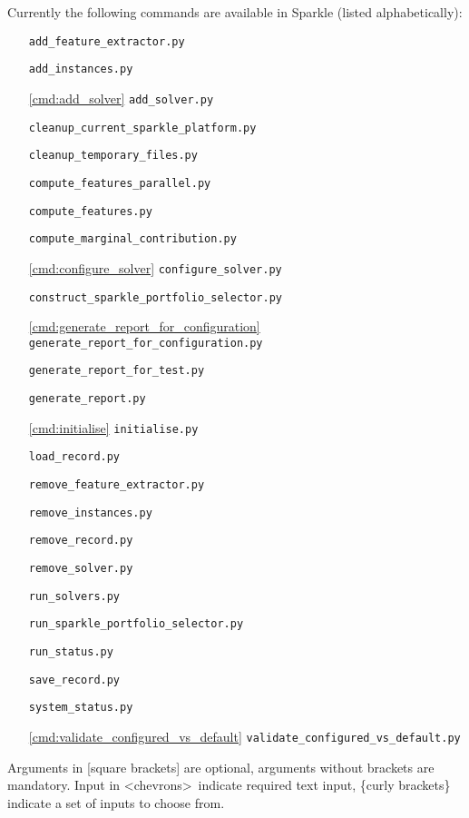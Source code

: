 \documentclass{article}
\begin{document}
Currently the following commands are available in Sparkle (listed alphabetically):

\begin{itemize}[noitemsep]
  \item[] \texttt{add\_feature\_extractor.py}
  \item[] \texttt{add\_instances.py}
  \item[\ref{cmd:add_solver}] \texttt{add\_solver.py}
  \item[] \texttt{cleanup\_current\_sparkle\_platform.py}
  \item[] \texttt{cleanup\_temporary\_files.py}
  \item[] \texttt{compute\_features\_parallel.py}
  \item[] \texttt{compute\_features.py}
  \item[] \texttt{compute\_marginal\_contribution.py}
  \item[\ref{cmd:configure_solver}] \texttt{configure\_solver.py}
  \item[] \texttt{construct\_sparkle\_portfolio\_selector.py}
  \item[\ref{cmd:generate_report_for_configuration}] \texttt{generate\_report\_for\_configuration.py}
  \item[] \texttt{generate\_report\_for\_test.py}
  \item[] \texttt{generate\_report.py}
  \item[\ref{cmd:initialise}] \texttt{initialise.py}
  \item[] \texttt{load\_record.py}
  \item[] \texttt{remove\_feature\_extractor.py}
  \item[] \texttt{remove\_instances.py}
  \item[] \texttt{remove\_record.py}
  \item[] \texttt{remove\_solver.py}
  \item[] \texttt{run\_solvers.py}
  \item[] \texttt{run\_sparkle\_portfolio\_selector.py}
  \item[] \texttt{run\_status.py}
  \item[] \texttt{save\_record.py}
  \item[] \texttt{system\_status.py}
  \item[\ref{cmd:validate_configured_vs_default}] \texttt{validate\_configured\_vs\_default.py}
\end{itemize}

Arguments in [square brackets] are optional, arguments without brackets are mandatory. Input in \textless chevrons\textgreater~indicate required text input, \{curly brackets\} indicate a set of inputs to choose from.
\end{document}
